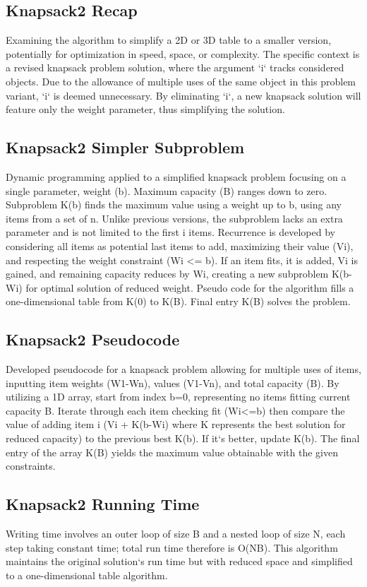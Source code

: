 \subsection*{Knapsack2  Recap}
Examining the algorithm to simplify a 2D or 3D table to a smaller version, potentially for optimization in speed, space, or complexity.
The specific context is a revised knapsack problem solution, where the argument `i` tracks considered objects.
Due to the allowance of multiple uses of the same object in this problem variant, `i` is deemed unnecessary.
By eliminating `i`, a new knapsack solution will feature only the weight parameter, thus simplifying the solution.

\subsection*{Knapsack2  Simpler Subproblem}
Dynamic programming applied to a simplified knapsack problem focusing on a single parameter, weight (b).
Maximum capacity (B) ranges down to zero.
Subproblem K(b) finds the maximum value using a weight up to b, using any items from a set of n.
Unlike previous versions, the subproblem lacks an extra parameter and is not limited to the first i items.
Recurrence is developed by considering all items as potential last items to add, maximizing their value (Vi), and respecting the weight constraint (Wi \textless{}= b).
If an item fits, it is added, Vi is gained, and remaining capacity reduces by Wi, creating a new subproblem K(b-Wi) for optimal solution of reduced weight.
Pseudo code for the algorithm fills a one-dimensional table from K(0) to K(B).
Final entry K(B) solves the problem.

\subsection*{Knapsack2  Pseudocode}
Developed pseudocode for a knapsack problem allowing for multiple uses of items, inputting item weights (W1-Wn), values (V1-Vn), and total capacity (B).
By utilizing a 1D array, start from index b=0, representing no items fitting current capacity B\@.
Iterate through each item checking fit (Wi\textless{}=b) then compare the value of adding item i (Vi + K(b-Wi) where K represents the best solution for reduced capacity) to the previous best K(b).
If it`s better, update K(b).
The final entry of the array K(B) yields the maximum value obtainable with the given constraints.

\subsection*{Knapsack2  Running Time}
Writing time involves an outer loop of size B and a nested loop of size N, each step taking constant time; total run time therefore is O(NB).
This algorithm maintains the original solution`s run time but with reduced space and simplified to a one-dimensional table algorithm.

